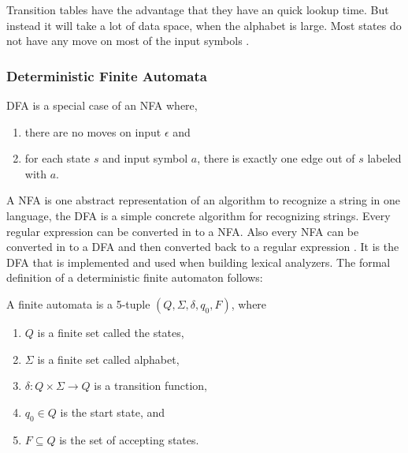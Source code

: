 Transition tables have the advantage that they have an quick lookup time. But 
instead it will take a lot of data space, when the alphabet is large. Most 
states do not have any move on most of the input symbols \cite{Aho2006}.
\subsubsection{Deterministic Finite Automata}
DFA is a special case of an NFA where,
\begin{enumerate}
  \item there are no moves on input $\epsilon$ and
  \item for each state $s$ and input symbol $a$, there is exactly one edge out
        of $s$ labeled with $a$.
\end{enumerate}
A NFA is one abstract representation of an algorithm to recognize a string 
in one language, the DFA is a simple concrete algorithm for recognizing strings. 
Every regular expression can be converted in to a NFA. Also every NFA can be 
converted in to a DFA and then converted back to a regular expression \cite{Aho2006}. 
It is the DFA that is implemented and used when building lexical analyzers.
The formal definition of a deterministic finite automaton follows:
\begin{definition} \label{finiteAutomataDef}
A finite automata is a 5-tuple $(Q, \Sigma, \delta, q_0, F)$, where
\begin{enumerate}
  \item $Q$ is a finite set called the states,
  \item $\Sigma$ is a finite set called alphabet,
  \item $\delta: Q \times \Sigma \to Q$ is a transition function,
  \item $q_0 \in Q$ is the start state, and
  \item $F \subseteq Q$ is the set of accepting states.
\end{enumerate} 
\end{definition}

